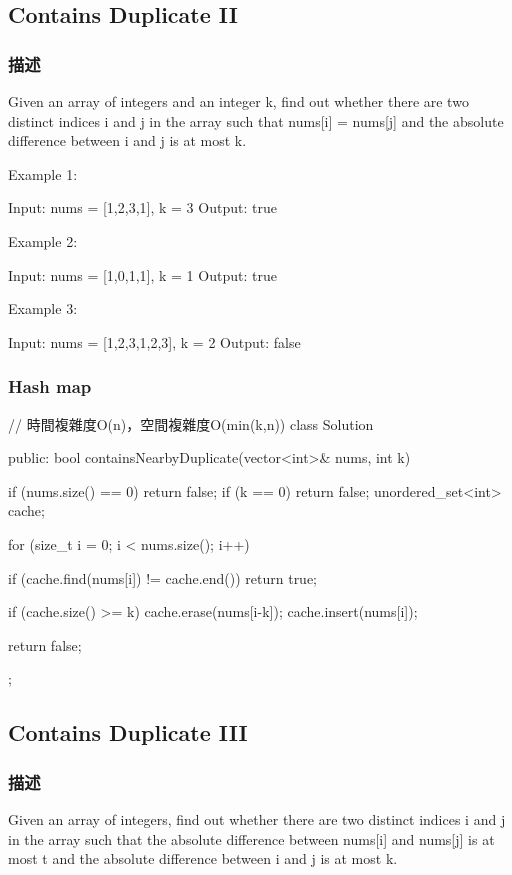 \subsection{Contains Duplicate II}
\label{sec:contains-duplicate-ii}

\subsubsection{描述}
Given an array of integers and an integer k, find out whether there are two distinct indices i and j in the array such that nums[i] = nums[j] and the absolute difference between i and j is at most k.

Example 1:
\begin{Code}
Input: nums = [1,2,3,1], k = 3
Output: true
\end{Code}

Example 2:
\begin{Code}
Input: nums = [1,0,1,1], k = 1
Output: true
\end{Code}

Example 3:
\begin{Code}
Input: nums = [1,2,3,1,2,3], k = 2
Output: false
\end{Code}

\subsubsection{Hash map}
\begin{Code}
// 時間複雜度O(n)，空間複雜度O(min(k,n))
class Solution {
public:
    bool containsNearbyDuplicate(vector<int>& nums, int k) {
        if (nums.size() == 0) return false;
        if (k == 0) return false;
        unordered_set<int> cache;

        for (size_t i = 0; i < nums.size(); i++)
        {
            if (cache.find(nums[i]) != cache.end()) return true;

            if (cache.size() >= k)
                cache.erase(nums[i-k]);
            cache.insert(nums[i]);
        }

        return false;
    }
};
\end{Code}


\subsection{Contains Duplicate III}
\label{sec:contains-duplicate-iii}

\subsubsection{描述}
Given an array of integers, find out whether there are two distinct indices i and j in the array such that the absolute difference between nums[i] and nums[j] is at most t and the absolute difference between i and j is at most k.


